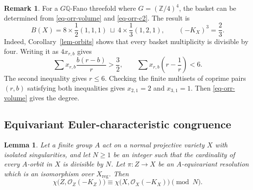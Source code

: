 \documentclass[10pt,oneside,reqno]{amsart}
\numberwithin{equation}{section}
\newtheorem{lemma}[theorem]{Lemma}
\theoremstyle{definition}
\newtheorem{remark}[theorem]{Remark}
\begin{document}
\begin{remark}
For a $G\mathbb{Q}$-Fano threefold where $G=(\mathbb{Z}/4)^4$, the
basket can be determined from \eqref{eq-orr-volume} and
\eqref{eq-orr-c2}.  The result is
\[
 B(X)=8\times\frac12(1,1,1)
 \ \sqcup\
 4\times\frac13(1,2,1),
 \qquad
 (-K_X)^3=\frac23.
\]
Indeed, Corollary~\ref{lem-orbits} shows that every basket
multiplicity is divisible by four.  Writing it as $4x_{r,b}$ gives
\[
 \sum x_{r,b}\frac{b(r-b)}r>\frac32,
 \qquad
 \sum x_{r,b}\left(r-\frac1r\right)<6.
\]
The second inequality gives $r\leq6$.  Checking the finite multisets of
coprime pairs $(r,b)$ satisfying both inequalities gives
$x_{2,1}=2$ and $x_{3,1}=1$. Then \eqref{eq-orr-volume} gives the
degree.
\end{remark}



\subsection{Equivariant Euler-characteristic congruence}

\begin{lemma}
\label{lem-euler-congruence}
Let a finite group $A$ act on a normal projective variety $X$ with
isolated singularities, and let $N\geq1$ be an integer such that the
cardinality of every $A$-orbit in $X$ is divisible by $N$.  Let
$\pi\colon Z\to X$ be an $A$-equivariant resolution which is an
isomorphism over $X_{\mathrm{reg}}$.  Then
\[
 \chi\bigl(Z,\mathcal O_Z(-K_Z)\bigr)\equiv
 \chi\bigl(X,\mathcal O_X(-K_X)\bigr)\pmod N.
\]
\end{lemma}
\end{document}
